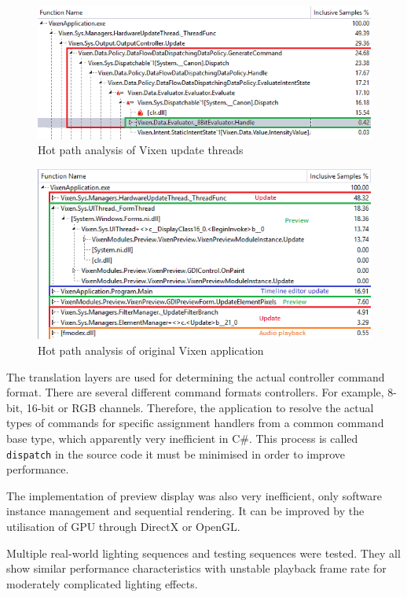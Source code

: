 \begin{figure}[t]
  \centering
  \includegraphics[width=0.85\columnwidth]{Figs/vixen_perf_original.png}
  \caption{\footnotesize Hot path analysis of Vixen update threads}
  \label{fig:vixen_perf_original}
\end{figure}

\begin{figure}[t]
  \centering
  \includegraphics[width=0.85\columnwidth]{Figs/vixen_perf_original_overview.png}
  \caption{\footnotesize Hot path analysis of original Vixen application}
  \label{fig:vixen_perf_original_overview}
\end{figure}

The translation layers are used for determining the actual controller command format. There are several different command formats  controllers. For example, 8-bit, 16-bit or RGB channels. Therefore, the application  to resolve the actual types of commands for specific assignment handlers from a common command base type, which  apparently very inefficient in C\#. This process is called \texttt{dispatch} in the source code\ca{;} it must be minimised in order to improve performance.

The implementation of  preview display was also very inefficient,  only software instance management and sequential rendering. It can be improved by the utilisation of GPU through DirectX or OpenGL.

Multiple real-world lighting sequences and testing sequences were tested. They all show similar performance characteristics with unstable playback frame rate for moderately complicated lighting effects.

